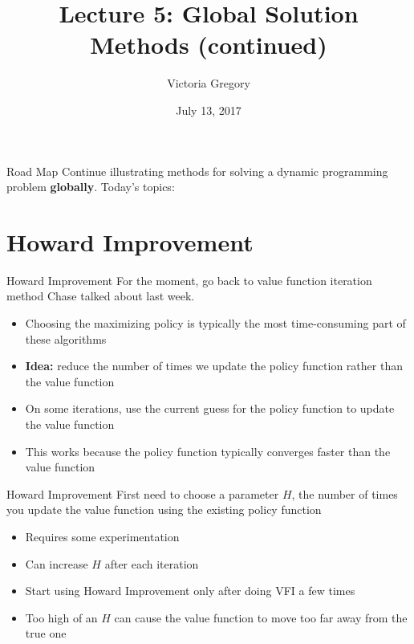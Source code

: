\documentclass{beamer}
\title{Lecture 5: Global Solution Methods (continued)}
\date{July 13, 2017}
\author{Victoria Gregory}
\institute{New York University}
\begin{document}
\maketitle

\begin{frame}{Road Map}
Continue illustrating methods for solving a dynamic programming problem \textbf{globally}. Today's topics:
  \tableofcontents
\end{frame}

\section{Howard Improvement}

\begin{frame}{Howard Improvement}
For the moment, go back to value function iteration method Chase talked about last week.
\begin{itemize}
\item Choosing the maximizing policy is typically the most time-consuming part of these algorithms
\item \textbf{Idea:} reduce the number of times we update the policy function rather than the value function
\item On some iterations, use the current guess for the policy function to update the value function
\item This works because the policy function typically converges faster than the value function
\end{itemize}
\end{frame}

\begin{frame}{Howard Improvement}
First need to choose a parameter $H$, the number of times you update the value function using the existing policy function
\begin{itemize}
\item Requires some experimentation
\item Can increase $H$ after each iteration
\item Start using Howard Improvement only after doing VFI a few times
\item Too high of an $H$ can cause the value function to move too far away from the true one
\end{itemize}
\end{frame}
\end{document}
